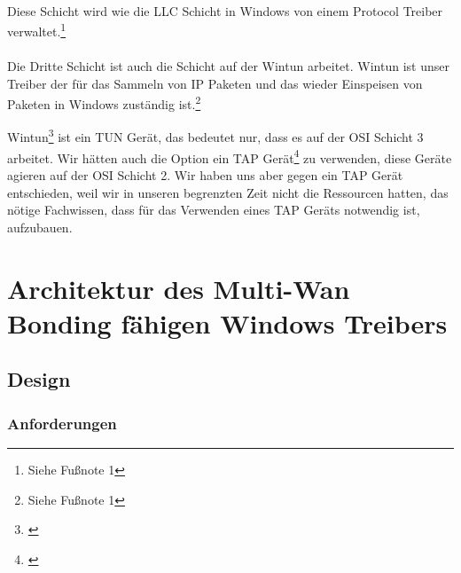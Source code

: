 \ \\
Diese Schicht wird wie die LLC Schicht in Windows von einem Protocol Treiber verwaltet.\footnote[7]{Siehe Fußnote 1}
\\\\
Die Dritte Schicht ist auch die Schicht auf der Wintun arbeitet. Wintun ist unser Treiber der für das Sammeln von IP Paketen und das wieder Einspeisen von Paketen in Windows zuständig ist.\footnote[8]{Siehe Fußnote 1}

\newpage

Wintun\footnote[1]{\cite[Vgl.][]{1}} ist ein TUN Gerät, das bedeutet nur, dass es auf der OSI Schicht 3 arbeitet. Wir hätten auch die Option ein TAP Gerät\footnote[1]{\cite[Vgl.][]{28}} zu verwenden, diese Geräte agieren auf der OSI Schicht 2. Wir haben uns aber gegen ein TAP Gerät entschieden, weil wir in unseren begrenzten Zeit nicht die Ressourcen hatten, das nötige Fachwissen, dass für das Verwenden eines TAP Geräts notwendig ist, aufzubauen.

\section{Architektur des Multi-Wan Bonding fähigen Windows Treibers}
\subsection{Design}
\subsubsection{Anforderungen}

